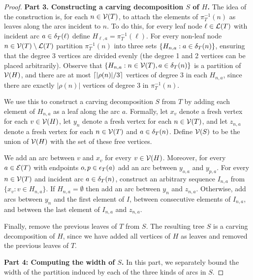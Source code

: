 \begin{proof}

\textbf{Part 3. Constructing a carving decomposition $S$ of $H$.}
The idea of the construction is, for each $n \in \mathcal{V}(T)$, to attach the elements of $\pi_T^{-1}(n)$ as leaves along the arcs incident to $n$. To do this, for every leaf node $\ell \in \mathcal{L}(T)$ with incident arc $a \in \delta_{T}(\ell)$ define $H_{\ell, a} = \pi_T^{-1}(\ell)$. For every non-leaf node $n \in \mathcal{V}(T) \setminus \mathcal{L}(T)$ partition $\pi_T^{-1}(n)$ into three sets $\{H_{n,a} : a \in \delta_{T}(n)\}$, ensuring that the degree 3 vertices are divided evenly (the degree 1 and 2 vertices can be placed arbitrarily). Observe that $\{H_{n,a} : n \in \mathcal{V}(T), a \in \delta_{T}(n)\}$ is a partition of $\mathcal{V}(H)$, and there are at most $\lceil|\rho(n)|/3\rceil$ vertices of degree 3 in each $H_{n,a}$, since there are exactly $|\rho(n)|$ vertices of degree 3 in $\pi_T^{-1}(n)$. 

We use this to construct a carving decomposition $S$ from $T$ by adding each element of $H_{n,a}$ as a leaf along the arc $a$. Formally, let $x_v$ denote a fresh vertex for each $v \in \mathcal{V}(H)$, let $y_n$ denote a fresh vertex for each $n \in \mathcal{V}(T)$, and let $z_{n,a}$ denote a fresh vertex for each $n \in \mathcal{V}(T)$ and $a \in \delta_{T}(n)$. Define $\mathcal{V}(S)$ to be the union of $\mathcal{V}(H)$ with the set of these free vertices. 

We add an arc between $v$ and $x_v$ for every $v \in \mathcal{V}(H)$. Moreover, for every $a \in \mathcal{E}(T)$ with endpoints $o, p \in \epsilon_{T}(a)$ add an arc between $y_{o,a}$ and $y_{p,a}$. For every $n \in \mathcal{V}(T)$ and incident arc $a \in \delta_{T}(n)$, construct an arbitrary sequence $I_{n,a}$ from $\{x_v : v \in H_{n,a}\}$. If $H_{n,a} = \emptyset$ then add an arc between $y_n$ and $z_{n,a}$. Otherwise, add arcs between $y_n$ and the first element of $I$, between consecutive elements of $I_{n,a}$, and between the last element of $I_{n,a}$ and $z_{n,a}$. 

Finally, remove the previous leaves of $T$ from $S$. The resulting tree $S$ is a carving decomposition of $H$, since we have added all vertices of $H$ as leaves and removed the previous leaves of $T$.

\textbf{Part 4: Computing the width of $S$.} In this part, we separately bound the width of the partition induced by each of the three kinds of arcs in $S$.


\end{proof}
